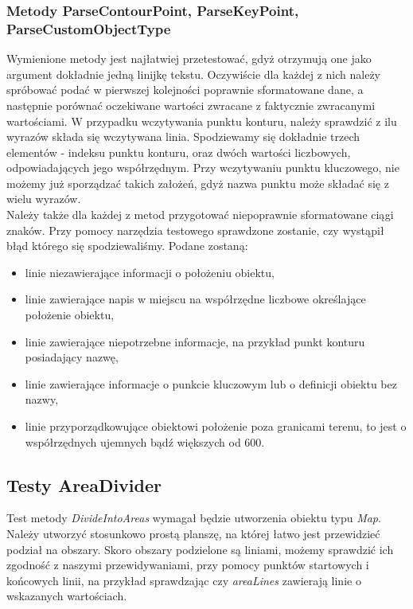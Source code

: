\documentclass[a4paper,11pt]{article}
\newcommand\tab[1][0.6cm]{\hspace*{#1}}
\begin{document}
\subsubsection{Metody ParseContourPoint, ParseKeyPoint, ParseCustomObjectType}
\tab Wymienione metody jest najłatwiej przetestować, gdyż otrzymują one jako argument dokładnie jedną linijkę tekstu. Oczywiście dla każdej z nich należy spróbować podać w pierwszej kolejności poprawnie sformatowane dane, a następnie porównać oczekiwane wartości zwracane z faktycznie zwracanymi wartościami. W przypadku wczytywania punktu konturu, należy sprawdzić z ilu wyrazów składa się wczytywana linia. Spodziewamy się dokładnie trzech elementów - indeksu punktu konturu, oraz dwóch wartości liczbowych, odpowiadających jego współrzędnym. Przy wczytywaniu punktu kluczowego, nie możemy już sporządzać takich założeń, gdyż nazwa punktu może składać się z wielu wyrazów. 
\\\tab Należy także dla każdej z metod przygotować niepoprawnie sformatowane ciągi znaków. Przy pomocy narzędzia testowego sprawdzone zostanie, czy wystąpił błąd którego się spodziewaliśmy. Podane zostaną:
\begin{itemize}
\item linie niezawierające informacji o położeniu obiektu,
\item linie zawierające napis w miejscu na współrzędne liczbowe określające położenie obiektu,
\item linie zawierające niepotrzebne informacje, na przykład punkt konturu posiadający nazwę,
\item linie zawierające informacje o punkcie kluczowym lub o definicji obiektu bez nazwy,
\item linie przyporządkowujące obiektowi położenie poza granicami terenu, to jest o współrzędnych ujemnych bądź większych od 600.

\end{itemize}

\subsection{Testy AreaDivider}

\tab Test metody \textit{DivideIntoAreas} wymagał będzie utworzenia obiektu typu \textit{Map}. Należy utworzyć stosunkowo prostą planszę, na której łatwo jest przewidzieć podział na obszary. Skoro obszary podzielone są liniami, możemy sprawdzić ich zgodność z naszymi przewidywaniami, przy pomocy punktów startowych i końcowych linii, na przykład sprawdzając czy \textit{areaLines} zawierają linie o wskazanych wartościach.
\end{document}
